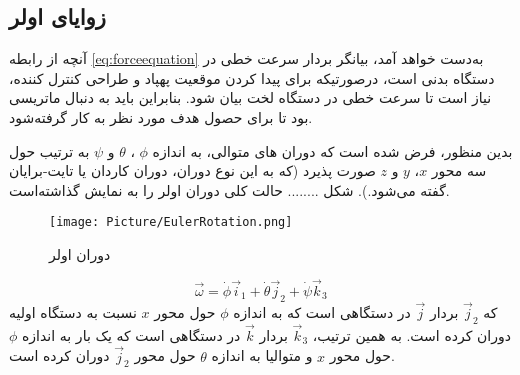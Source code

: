 \subsection{زوایای اولر}\label{euler}
آنچه از رابطه \ref{eq:forceequation} به‌دست خواهد آمد، بیانگر بردار سرعت خطی در دستگاه بدنی است، درصورتیکه برای پیدا کردن موقعیت پهپاد و طراحی کنترل کننده، نیاز است تا سرعت خطی در دستگاه لخت بیان شود.
 بنابراین  باید به دنبال ماتریسی بود تا برای حصول هدف مورد نظر به کار گرفته‌شود.

بدین منظور، فرض شده است که دوران های متوالی، به اندازه $ \phi $ ، $ \theta $ و $ \psi $ به ترتیب حول سه محور $x$، $y$ و $z$ صورت پذیرد (که به این نوع دوران، دوران کاردان یا تایت-برایان گفته می‌شود.).
شکل ........ حالت کلی دوران اولر را به نمایش گذاشته‌است.
\begin{figure}[t]
\centering 
\texttt{[image: Picture/EulerRotation.png]}
\caption{دوران اولر}
\label{pic:EulerRotation} %
\end{figure}

\begin{equation}
\vec{\omega}=\dot \phi \vec{i}_1 + \dot \theta \vec{j}_2+\dot \psi \vec{k}_3
\end{equation}
که $ \vec{j}_2 $ بردار $ \vec{j} $  در دستگاهی است که به اندازه $ \phi  $  حول محور $ x  $ نسبت به دستگاه اولیه دوران کرده است.
به همین ترتیب، $ \vec{k}_3 $ بردار $ \vec{k} $ در دستگاهی است که یک بار به اندازه $ \phi  $  حول محور $ x  $ و متوالیا به اندازه $ \theta  $  حول محور $\vec{j}_2  $  دوران کرده است.

